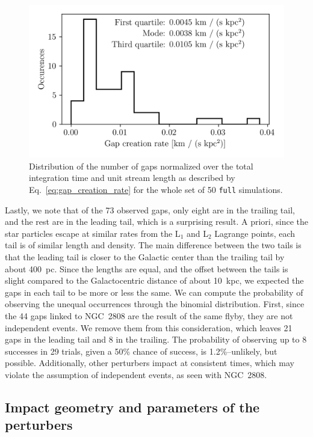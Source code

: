         \begin{figure}
            \centering
            \includegraphics[width=.7\linewidth]{images/gap_creation_rate.png}
            \caption[Normalized distribution of the number of gaps]{Distribution of the number of gaps normalized over the total integration time and unit stream length as described by Eq.~\ref{eq:gap_creation_rate} for the whole set of 50 \texttt{full} simulations. }
            \label{fig:gapcreationrate}
        \end{figure}

        Lastly, we note that of the 73 observed gaps, only eight are in the trailing tail, and the rest are in the leading tail, which is a surprising result. A priori, since the star particles escape at similar rates from the L$_1$ and L$_2$ Lagrange points, each tail is of similar length and density. The main difference between the two tails is that the leading tail is closer to the Galactic center than the trailing tail by about 400~pc. Since the lengths are equal, and the offset between the tails is slight compared to the Galactocentric distance of about 10~kpc, we expected the gaps in each tail to be more or less the same. We can compute the probability of observing the unequal occurrences through the binomial distribution. First, since the 44 gaps linked to NGC~2808 are the result of the same flyby, they are not independent events. We remove them from this consideration, which leaves 21 gaps in the leading tail and 8 in the trailing. The probability of observing up to 8 successes in 29 trials, given a 50\% chance of success, is 1.2\%--unlikely, but possible. Additionally, other perturbers impact at consistent times, which may violate the assumption of independent events, as seen with NGC~2808.

    \subsection{Impact geometry and parameters of the perturbers}\label{sect:geometry}

